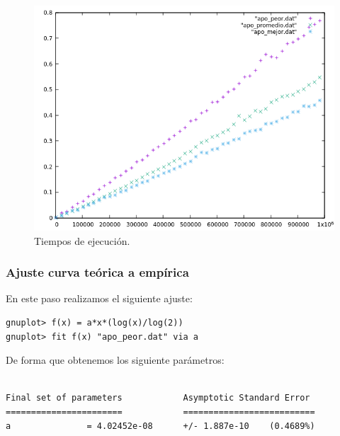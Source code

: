 \begin{figure}[H]
    \begin{center}
        \includegraphics[scale=0.7]{imagenes/g_apo.png}
        \caption{Tiempos de ejecución.}
        \label{fig22}
    \end{center}
\end{figure}

\subsubsection{Ajuste curva teórica a empírica}

En este paso realizamos el siguiente ajuste:
\begin{shaded*}
\begin{verbatim}
gnuplot> f(x) = a*x*(log(x)/log(2))
gnuplot> fit f(x) "apo_peor.dat" via a
\end{verbatim}
\end{shaded*}

De forma que obtenemos los siguiente parámetros:

\begin{shaded*}
\begin{verbatim}

Final set of parameters            Asymptotic Standard Error
=======================            ==========================
a               = 4.02452e-08      +/- 1.887e-10    (0.4689%)

\end{verbatim}
\end{shaded*}

